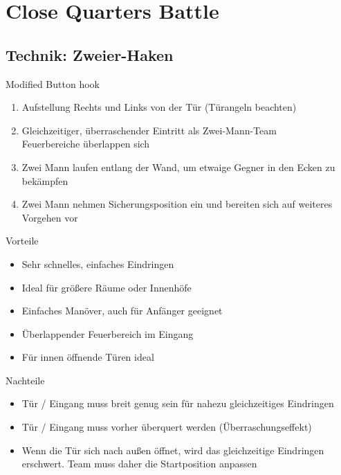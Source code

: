 \newpage
\section{Close Quarters Battle}
\label{CQB}
\subsection{Technik: Zweier-Haken}
\begin{center}
	Modified Button hook
\end{center}
\begin{enumerate}
	\item Aufstellung Rechts und Links von der Tür (Türangeln beachten)
	\item Gleichzeitiger, überraschender Eintritt als Zwei-Mann-Team \\
		Feuerbereiche überlappen sich
	\item Zwei Mann laufen entlang der Wand, um etwaige Gegner in den Ecken zu bekämpfen
	\item Zwei Mann nehmen Sicherungsposition ein und bereiten sich auf weiteres Vorgehen vor
 \end{enumerate}        
 Vorteile
 \begin{itemize}
	 \item Sehr schnelles, einfaches Eindringen
	 \item Ideal für größere Räume oder Innenhöfe
	 \item Einfaches Manöver, auch für Anfänger geeignet
	 \item Überlappender Feuerbereich im Eingang
	 \item Für innen öffnende Türen ideal
 \end{itemize}     
  Nachteile
  \begin{itemize}
  	\item Tür / Eingang muss breit genug sein für nahezu gleichzeitiges Eindringen
  	\item Tür / Eingang muss vorher überquert werden (Überraschungseffekt)
  	\item Wenn die Tür sich nach außen öffnet, wird das gleichzeitige Eindringen erschwert. Team muss daher die Startposition anpassen
  \end{itemize}          
